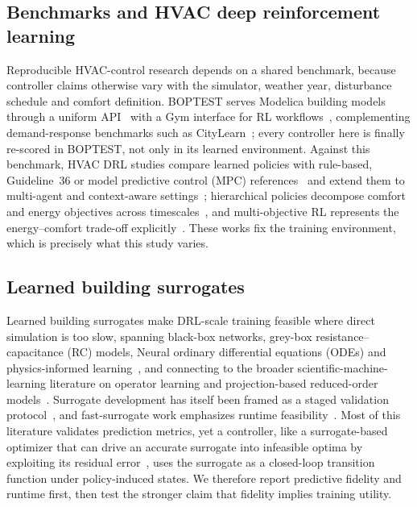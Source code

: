 \documentclass[5p]{elsarticle}
\begin{document}
\subsection{Benchmarks and HVAC deep reinforcement learning}
Reproducible HVAC-control research depends on a shared benchmark, because controller claims
otherwise vary with the simulator, weather year, disturbance schedule and comfort definition.
BOPTEST serves Modelica building models through a uniform
API~\cite{Blum2021BOPTEST,Wetter2014Modelica} with a Gym interface for RL
workflows~\cite{Arroyo2021GymBOPTEST}, complementing demand-response benchmarks such as
CityLearn~\cite{VazquezCanteli2019CityLearn,VazquezCanteli2019Review}; every controller here is
finally re-scored in BOPTEST, not only in its learned environment. Against this benchmark, HVAC DRL
studies compare learned policies with rule-based, Guideline~36 or model predictive control (MPC)
references~\cite{Savino2025ASHRAE,Wang2025SafeDRL,Nguyen2024Modelling,Sun2024DirectTSup} and extend
them to multi-agent and context-aware
settings~\cite{Deng2025MultiAgent,Alotaibi2025ContextAware}; hierarchical policies decompose
comfort and energy objectives across timescales~\cite{Liao2025HDRL,Bacon2017Options,Nachum2018HIRO},
and multi-objective RL represents the energy--comfort trade-off
explicitly~\cite{Yang2019MORL,Roijers2013MOSurvey,Hayes2022MOSurvey,Byeon2025MaxMinMORL}. These
works fix the training environment, which is precisely what this study varies.

\subsection{Learned building surrogates}
Learned building surrogates make DRL-scale training feasible where direct simulation is too slow,
spanning black-box networks, grey-box resistance--capacitance (RC) models, Neural ordinary differential equations (ODEs) and physics-informed
learning~\cite{Bacher2011RCIdentification,Berthou2014RC,Bunning2020RC,Picard2017WhiteBox,Raissi2019PINN,Chen2018NeuralODE,Karpatne2017TheoryGuided,Willard2022PIML,Hedayat2025PINN},
and connecting to the broader scientific-machine-learning literature on operator learning and
projection-based reduced-order models~\cite{Lu2021DeepONet,Li2021FNO,Benner2015ROM}. Surrogate
development has itself been framed as a staged validation protocol~\cite{HouEvins2024}, and
fast-surrogate work emphasizes runtime feasibility~\cite{Mshragi2026FastML}. Most of this literature
validates prediction metrics, yet a controller, like a surrogate-based optimizer that can drive an
accurate surrogate into infeasible optima by exploiting its residual error~\cite{Jones1998EGO}, uses
the surrogate as a closed-loop transition function under policy-induced states. We therefore report
predictive fidelity and runtime first, then test the stronger claim that fidelity implies training
utility.
\end{document}
